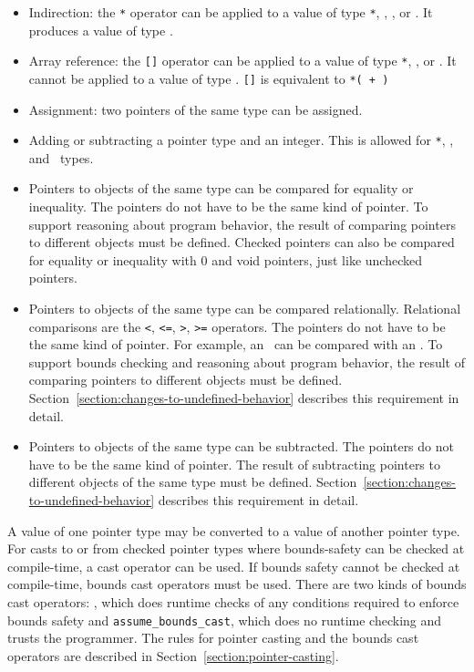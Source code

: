 \begin{itemize}
\item
  Indirection: the \texttt{*} operator can be applied to a value of type
   \texttt{*},
  \ptrT,
  \arrayptrT, or
  \spanptrT. It
  produces a value of type .
\item
  Array reference: the \texttt{[]} operator can be applied to a
  value of type  \texttt{*}, \arrayptrT, or \spanptrT. It
  cannot be applied to a value of type \ptrT.
  \texttt{[]} is equivalent to
  \texttt{*( + )}
\item
  Assignment: two pointers of the same type can be assigned.
\item
  Adding or subtracting a pointer type and an integer. This is allowed
  for  \texttt{*}, \arrayptrT, and \spanptrT\ types.
\item
  Pointers to objects of the same type can be compared for equality or
  inequality. The pointers do not have to be the same kind of pointer.
  To support reasoning about program behavior, the result of comparing
  pointers to different objects must be defined.  Checked pointers can also
  be compared for equality or inequality with 0 and void pointers, 
  just like unchecked pointers.
\item
  Pointers to objects of the same type can be compared relationally. Relational comparisons are the
  \verb|<|, \verb|<=|, \verb|>|, \verb|>=| operators. The pointers do not have to be
  the same kind of pointer. For example, an \uncheckedptrT\ can be compared with an
  \arrayptrT . To support bounds checking and reasoning about program behavior, the
  result of comparing pointers to different objects must be defined.
  Section~\ref{section:changes-to-undefined-behavior} describes this requirement in detail.
\item
  Pointers to objects of the same type can be subtracted. The pointers do not have to be
  the same kind of
  pointer. The result of subtracting pointers to different objects of
  the same type must be defined. Section~\ref{section:changes-to-undefined-behavior}
  describes this requirement in detail.
\end{itemize}

A value of one pointer type may be converted to a value of another
pointer type. For casts to or from checked pointer types where
bounds-safety can be checked at compile-time, a cast operator can be
used. If bounds safety cannot be checked at compile-time, bounds cast
operators must be used. There are two kinds of bounds cast operators:
, which does runtime checks of any
conditions required to enforce bounds safety and
\texttt{assume\_bounds\_cast}, which does no runtime checking and
trusts the programmer. The rules for pointer casting and the bounds cast
operators are described in Section~\ref{section:pointer-casting}.

